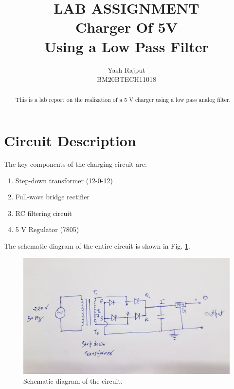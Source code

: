 \documentclass[journal,12pt,twocolumn]{IEEEtran}
\begin{document}
\let\StandardTheFigure\thefigure
\renewcommand{\thefigure}{\arabic{section}.\arabic{figure}}
\makeatletter
{}
\makeatother


\def\putbox#1#2#3{\makebox[0in][l]{\makebox[#1][l]{}\raisebox{\baselineskip}[0in][0in]{\raisebox{#2}[0in][0in]{#3}}}}
     \def\rightbox#1{\makebox[0in][r]{#1}}
     \def\centbox#1{\makebox[0in]{#1}}
     \def\topbox#1{\raisebox{-\baselineskip}[0in][0in]{#1}}
     \def\midbox#1{\raisebox{-0.5\baselineskip}[0in][0in]{#1}}

\vspace{3cm}

\title{LAB ASSIGNMENT\\Charger Of 5V\\ Using a Low Pass Filter}
\author{Yash Rajput\\BM20BTECH11018}
\maketitle
\tableofcontents
\renewcommand{\thetable}{\theenumi}
\bigskip
\begin{abstract}
    This is a lab report on the realization of a 5 V charger using
    a low pass analog filter.
\end{abstract}
\section{Circuit Description}
The key components of the charging circuit are:
\begin{enumerate}
    \item Step-down transformer (12-0-12)
    \item Full-wave bridge rectifier
    \item RC filtering circuit
    \item 5 V Regulator (7805)
\end{enumerate}

The schematic diagram of the entire circuit is shown in Fig. \ref{fig:ckt}.
\begin{figure}[!htb]
    \includegraphics[width=\columnwidth]{figs/circuit.jpg}
    \caption{Schematic diagram of the circuit.}
    \label{fig:ckt} 
\end{figure}
\end{document}

